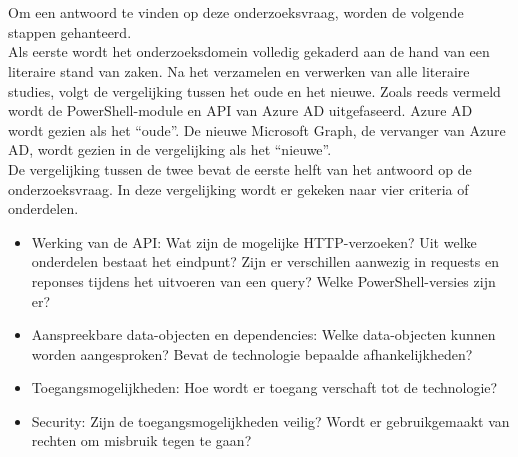 
\chapter{}%
\label{ch:methodologie}


Om een antwoord te vinden op deze onderzoeksvraag, worden de volgende stappen gehanteerd. \\

Als eerste wordt het onderzoeksdomein volledig gekaderd aan de hand van een literaire stand van zaken. Na het verzamelen en verwerken van alle literaire studies, volgt de vergelijking tussen het oude en het nieuwe. Zoals reeds vermeld wordt de PowerShell-module en \ac{API} van Azure \ac{AD} uitgefaseerd. Azure \ac{AD} wordt gezien als het “oude”. De nieuwe Microsoft Graph, de vervanger van Azure \ac{AD}, wordt gezien in de vergelijking als het “nieuwe”. \\

De vergelijking tussen de twee bevat de eerste helft van het antwoord op de onderzoeksvraag. In deze vergelijking wordt er gekeken naar vier criteria of onderdelen. 

\begin{itemize}
    \item Werking van de \ac{API}: Wat zijn de mogelijke \Ac{HTTP}-verzoeken? Uit welke onderdelen bestaat het eindpunt? Zijn er verschillen aanwezig in requests en reponses tijdens het uitvoeren van een query? Welke PowerShell-versies zijn er?
    \item Aanspreekbare data-objecten en dependencies: Welke data-objecten kunnen worden aangesproken? Bevat de technologie bepaalde afhankelijkheden?
    \item Toegangsmogelijkheden: Hoe wordt er toegang verschaft tot de technologie? 
    \item Security: Zijn de toegangsmogelijkheden veilig? Wordt er gebruikgemaakt van rechten om misbruik tegen te gaan?
\end{itemize}

